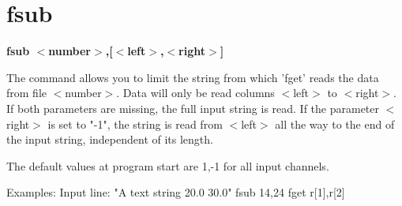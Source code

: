 \section{fsub}
{\bf fsub $ <$number$> $,[$ <$left$> $,$ <$right$> $] \par }
\par
\vspace{3pt}
The command allows you to limit the string from which 'fget' reads the 
data from file $ <$number$> $. Data will only be read columns $ <$left$> $ to $ <$right$> $. 
If both parameters are missing, the full input string is read. 
If the parameter $ <$right$> $ is set to "-1", the string is read from $ <$left$> $ 
all the way to the end of the input string, independent of its length. 
\par
The default values at program start are 1,-1 for all input channels. 
\par
\begin{MacVerbatim}
Examples:
  Input line: "A text string 20.0  30.0"
  fsub 14,24
  fget r[1],r[2]
\end{MacVerbatim}
